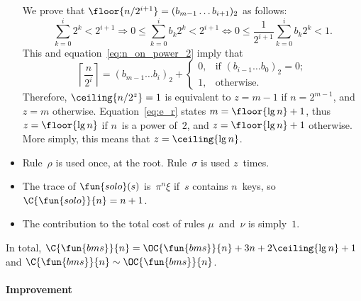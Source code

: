 \begin{itemize}
\begin{equation}
      \label{eq:n_on_power_2}
    \end{equation}
    We prove that \(\floor{n/2^{i+1}} = (b_{m-1}\dots b_{i+1})_2\) as
    follows:
    \begin{equation*}
      \sum_{k=0}^{i}{2^k} < 2^{i+1}
      \Rightarrow
      0 \leqslant \sum_{k=0}^{i}{b_k2^k} < 2^{i+1}
      \Leftrightarrow
      0 \leqslant \frac{1}{2^{i+1}}\sum_{k=0}^{i}{b_k2^k} < 1.
    \end{equation*}
    This and equation~\eqref{eq:n_on_power_2} imply that
    \begin{equation*}
      \left\lceil\frac{n}{2^i}\right\rceil =
      (b_{m-1}\dots b_i)_2
      + \begin{cases}
          0, & \text{if \((b_{i-1}\dots b_0)_2=0\)};\\
          1, & \text{otherwise}.
        \end{cases}
    \end{equation*}
    Therefore, \(\ceiling{n/2^z} = 1\) is equivalent to \(z=m-1\)
    if \(n=2^{m-1}\), and \(z=m\) otherwise. Equation~\eqref{eq:e_r}
     states \(m = \floor{\lg n} + 1\), thus
    \(z=\floor{\lg n}\) if \(n\)~is a power of~\(2\), and
    \(z=\floor{\lg n} + 1\) otherwise. More simply, this means that
    \(z=\ceiling{\lg n}\).

  \item Rule~\(\rho\) is used once, at the root. Rule~\(\sigma\) is
    used \(z\)~times.

  \item The trace of \(\fun{solo}(s)\)
    is~\(\pi^n\xi\) if~\(s\) contains \(n\)~keys, so
    \(\C{\fun{solo}}{n} = n + 1\).

  \item The contribution to the total cost of rules
    \(\mu\)~and~\(\nu\) is simply~\(1\).

\end{itemize}
In total, \(\C{\fun{bms}}{n} = \OC{\fun{bms}}{n} + 3n + 2\ceiling{\lg
  n} + 1\) and \(\C{\fun{bms}}{n} \sim
\OC{\fun{bms}}{n}\).

\paragraph{Improvement}

